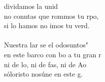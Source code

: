 \begin{cancion}
	dividamos la unid\\
	no conntas que rommos tu rpo,\\
	si lo hamos no imos tu verd.\\
\jump\\
	Nuestra lar se el odosuntos"\\
	en este barco con bo a tu gran r\\
	ni de lo, ni de fas, ni de Ao\\
	sóloristo nosúne en este g.\\
\end{cancion}%
